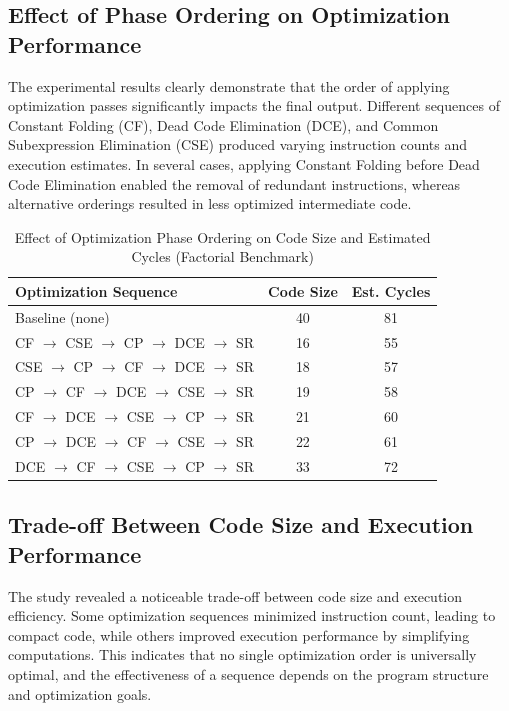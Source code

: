 \documentclass[conference]{IEEEtran}
\begin{document}
\subsection{Effect of Phase Ordering on Optimization Performance}
The experimental results clearly demonstrate that the order of applying optimization passes significantly impacts the final output. Different sequences of Constant Folding (CF), Dead Code Elimination (DCE), and Common Subexpression Elimination (CSE) produced varying instruction counts and execution estimates. In several cases, applying Constant Folding before Dead Code Elimination enabled the removal of redundant instructions, whereas alternative orderings resulted in less optimized intermediate code.
\begin{table}[!htbp]
\centering
\caption{Effect of Optimization Phase Ordering on Code Size and Estimated Cycles (Factorial Benchmark)}
\label{tab:phase_order_tradeoff}
\renewcommand{\arraystretch}{1.2}
{\small
\begin{tabularx}{\columnwidth}{@{}Xcc@{}}
\toprule
\textbf{Optimization Sequence} & \textbf{Code Size} & \textbf{Est. Cycles} \\
\midrule
Baseline (none) & 40 & 81 \\
CF $\to$ CSE $\to$ CP $\to$ DCE $\to$ SR & 16 & 55 \\
CSE $\to$ CP $\to$ CF $\to$ DCE $\to$ SR & 18 & 57 \\
CP $\to$ CF $\to$ DCE $\to$ CSE $\to$ SR & 19 & 58 \\
CF $\to$ DCE $\to$ CSE $\to$ CP $\to$ SR & 21 & 60 \\
CP $\to$ DCE $\to$ CF $\to$ CSE $\to$ SR & 22 & 61 \\
DCE $\to$ CF $\to$ CSE $\to$ CP $\to$ SR & 33 & 72 \\
\bottomrule
\end{tabularx}
}
\end{table}

\subsection{Trade-off Between Code Size and Execution Performance}
The study revealed a noticeable trade-off between code size and execution efficiency. Some optimization sequences minimized instruction count, leading to compact code, while others improved execution performance by simplifying computations. This indicates that no single optimization order is universally optimal, and the effectiveness of a sequence depends on the program structure and optimization goals.
\end{document}
